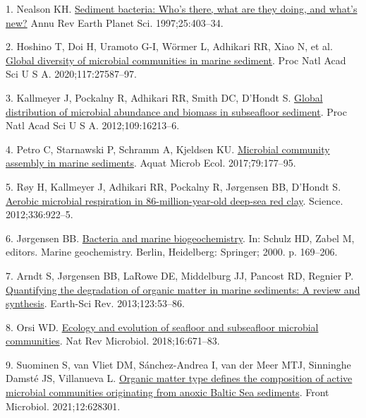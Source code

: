\documentclass[
  12 pt,
]{article}
\newlength{\cslhangindent}
\newlength{\cslentryspacingunit} %
\newenvironment{CSLReferences}[2] %
 {%
  \setlength{\parindent}{0pt}
  \ifodd #1
  \let\oldpar\par
  \def\par{\hangindent=\cslhangindent\oldpar}
  \fi
  \setlength{\parskip}{#2\cslentryspacingunit}
 }%
 {}
\begin{document}
\hypertarget{refs}{}
\begin{CSLReferences}{0}{0}
\leavevmode{}%
1. Nealson KH. \href{https://doi.org/10.1146/annurev.earth.25.1.403}{Sediment bacteria: Who's there, what are they doing, and what's new?} Annu Rev Earth Planet Sci. 1997;25:403--34.

\leavevmode{}%
2. Hoshino T, Doi H, Uramoto G-I, Wörmer L, Adhikari RR, Xiao N, et al. \href{https://doi.org/10.1073/pnas.1919139117}{Global diversity of microbial communities in marine sediment}. Proc Natl Acad Sci U S A. 2020;117:27587--97.

\leavevmode{}%
3. Kallmeyer J, Pockalny R, Adhikari RR, Smith DC, D'Hondt S. \href{https://doi.org/10.1073/pnas.1203849109}{Global distribution of microbial abundance and biomass in subseafloor sediment}. Proc Natl Acad Sci U S A. 2012;109:16213--6.

\leavevmode{}%
4. Petro C, Starnawski P, Schramm A, Kjeldsen KU. \href{https://doi.org/10.3354/ame01826}{Microbial community assembly in marine sediments}. Aquat Microb Ecol. 2017;79:177--95.

\leavevmode{}%
5. Røy H, Kallmeyer J, Adhikari RR, Pockalny R, Jørgensen BB, D'Hondt S. \href{https://doi.org/10.1126/science.1219424}{Aerobic microbial respiration in 86-million-year-old deep-sea red clay}. Science. 2012;336:922--5.

\leavevmode{}%
6. Jørgensen BB. \href{https://doi.org/10.1007/978-3-662-04242-7_5}{Bacteria and marine biogeochemistry}. In: Schulz HD, Zabel M, editors. Marine geochemistry. Berlin, Heidelberg: Springer; 2000. p. 169--206.

\leavevmode{}%
7. Arndt S, Jørgensen BB, LaRowe DE, Middelburg JJ, Pancost RD, Regnier P. \href{https://doi.org/10.1016/j.earscirev.2013.02.008}{Quantifying the degradation of organic matter in marine sediments: A review and synthesis}. Earth-Sci Rev. 2013;123:53--86.

\leavevmode{}%
8. Orsi WD. \href{https://doi.org/10.1038/s41579-018-0046-8}{Ecology and evolution of seafloor and subseafloor microbial communities}. Nat Rev Microbiol. 2018;16:671--83.

\leavevmode{}%
9. Suominen S, van Vliet DM, Sánchez-Andrea I, van der Meer MTJ, Sinninghe Damsté JS, Villanueva L. \href{https://doi.org/10.3389/fmicb.2021.628301}{Organic matter type defines the composition of active microbial communities originating from anoxic {Baltic Sea} sediments}. Front Microbiol. 2021;12:628301.


\end{CSLReferences}
\end{document}
